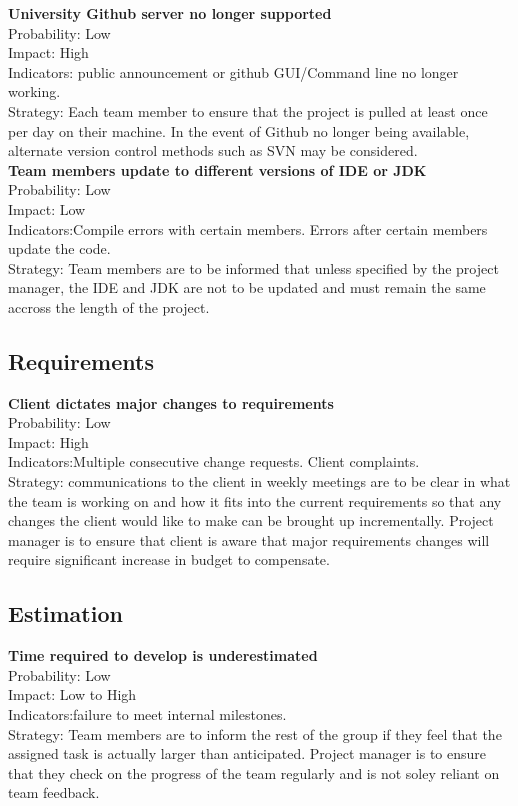 			\textbf{University Github server no longer supported}\\
			Probability: Low\\
			Impact: High\\
			Indicators: public announcement or github GUI/Command line no longer working. \\
			Strategy: Each team member to ensure that the project is pulled at least once per day on their machine. In the event of Github no longer being available, alternate version control methods such as SVN may be considered.\\

			\textbf{Team members update to different versions of IDE or JDK}\\
			Probability: Low\\
			Impact: Low\\
			Indicators:Compile errors with certain members. Errors after certain members update the code.\\
			Strategy: Team members are to be informed that unless specified by the project manager, the IDE and JDK are not to be updated and must remain the same accross the length of the project. \\

			\subsection*{Requirements}
			\textbf{Client dictates major changes to requirements}\\
			Probability: Low\\
			Impact: High\\
			Indicators:Multiple consecutive change requests. Client complaints. \\
			Strategy: communications to the client in weekly meetings are to be clear in what the team is working on and how it fits into the current requirements so that any changes the client would like to make can be brought up incrementally. Project manager is to ensure that client is aware that major requirements changes will require significant increase in budget to compensate.\\

			\subsection*{Estimation}
			\textbf{Time required to develop is underestimated}\\
			Probability: Low\\
			Impact: Low to High\\
			Indicators:failure to meet internal milestones.\\
			Strategy: Team members are to inform the rest of the group if they feel that the assigned task is actually larger than anticipated. Project manager is to ensure that they check on the progress of the team regularly and is not soley reliant on team feedback.


